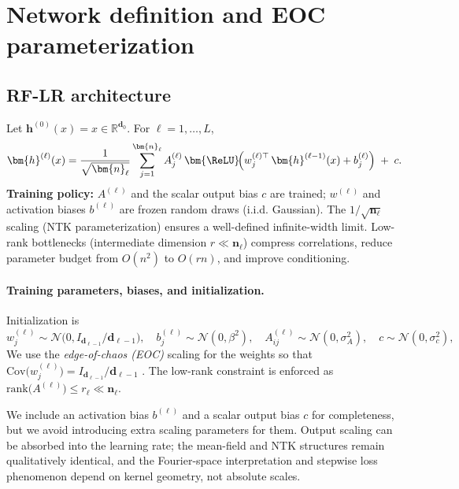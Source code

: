 \section{Network definition and EOC parameterization}

\vspace{1em}
\subsection{RF-LR architecture}
Let \( \bm{h}^{(0)}(x)=x\in\mathbb{R}^{\bm{d}_0} \). For \( \ell=1,\dots,L \),
\begin{equation}
\label{eq:RF-LR}
\bm{h}^{(\ell)}(x)
= \frac{1}{\sqrt{\bm{n}_\ell}} \sum_{j=1}^{\bm{n}_\ell} A^{(\ell)}_j\,
\bm{\ReLU}\!\Big(w^{(\ell)\top}_j\,\bm{h}^{(\ell-1)}(x) + b^{(\ell)}_j\Big) \;+\; c.
\end{equation}
\textbf{Training policy:} \( A^{(\ell)} \) and the scalar output bias \( c \) are trained; \( w^{(\ell)} \) and activation biases \( b^{(\ell)} \) are frozen random draws (i.i.d. Gaussian). The \( 1/\sqrt{\bm{n}_\ell} \) scaling (NTK parameterization) ensures a well-defined infinite-width limit. Low-rank bottlenecks (intermediate dimension \( r\ll \bm{n}_\ell \)) compress correlations, reduce parameter budget from \( O(n^2) \) to \( O(rn) \), and improve conditioning.

\paragraph{Training parameters, biases, and initialization.}
Initialization is
\[
w^{(\ell)}_j \sim \mathcal{N}\!\big(0, I_{\bm{d}_{\ell-1}}/\bm{d}_{\ell-1}\big),\quad
b^{(\ell)}_j \sim \mathcal{N}(0, \beta^2),\quad
A^{(\ell)}_{ij} \sim \mathcal{N}\!(0, \sigma_A^2),\quad
c \sim \mathcal{N}(0, \sigma_c^2),
\]
We use the \emph{edge-of-chaos (EOC)} scaling for the weights so that \( \mathrm{Cov}\!\big(w^{(\ell)}_j\big) = I_{\bm{d}_{\ell-1}}/\bm{d}_{\ell-1} \) \cite{hayou2018selectioninitializationactivationfunction}.
The low-rank constraint is enforced as \( \mathrm{rank}\!\big(A^{(\ell)}\big)\le r_\ell \ll \bm{n}_\ell \).

We include an activation bias \( b^{(\ell)} \) and a scalar output bias \( c \) for completeness, but we avoid introducing extra scaling parameters for them. Output scaling can be absorbed into the learning rate; the mean-field and NTK structures remain qualitatively identical, and the Fourier-space interpretation and stepwise loss phenomenon depend on kernel geometry, not absolute scales.

